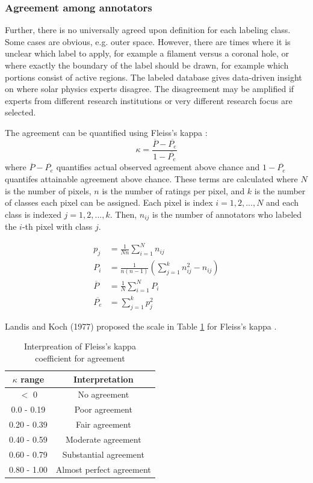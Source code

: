 \documentclass[twoside]{report}
\newcommand{\todo}[1]{{\color{red}{\textbf{#1}}}}
\begin{document}
\subsubsection{Agreement among annotators} \label{sec:agreement}
Further, there is no universally agreed upon definition for each labeling class. Some cases are obvious, e.g. outer space. However, there are times where it is unclear which label to apply, for example a filament versus a coronal hole, or where exactly the boundary of the label should be drawn, for example which portions consist of active regions. The labeled database gives data-driven insight on where solar physics experts disagree. The disagreement may be amplified if experts from different research institutions or very different research focus are selected. 

\todo{complete analysis}

The agreement can be quantified using Fleiss's kappa \cite{landiskoch}:
\[ \kappa = \frac{\overline{P} -    \overline{P_e}}{1-\overline{P_e}} \] where $\overline{P} - \overline{P_e}$ quantifies actual observed agreement above chance and $1 - \overline{P_e}$ quantifes attainable agreement above chance. These terms are calculated where $N$ is the number of pixels, $n$ is the number of ratings per pixel, and $k$ is the number of classes each pixel can be assigned. Each pixel is index $i = 1, 2, ..., N$ and each class is indexed $j = 1, 2, ..., k$. Then, $n_{ij}$ is the number of annotators who labeled the $i$-th pixel with class $j$. 

\begin{align*}
p_j &= \frac{1}{Nn} \sum_{i=1}^{N} n_{ij} \\
P_i &= \frac{1}{n(n-1)} \left(\sum_{j=1}^{k} n_{ij}^2 - n_{ij} \right) \\
\overline{P} &= \frac{1}{N} \sum_{i=1}^N P_i \\
\overline{P_e} &= \sum_{j=1}^k p_j^2
\end{align*}

Landis and Koch (1977) proposed the scale in Table \ref{tab:fleiss} for Fleiss's kappa \cite{landiskoch}. 

\begin{table}[ht!]
  \centering
  \begin{tabular}{|c c|}
  \hline    
$\kappa$ range &  Interpretation \\
\hline \hline
$<$ 0 & No agreement \\ 
0.0 - 0.19 & Poor agreement \\ 
0.20 - 0.39 & Fair agreement \\
0.40 - 0.59 & Moderate agreement \\
0.60 - 0.79 & Substantial agreement \\ 
0.80 - 1.00 & Almost perfect agreement \\
\hline
  \end{tabular}
  \caption{Interpreation of Fleiss's kappa coefficient for agreement}
  \label{tab:fleiss}
\end{table}
\end{document}

